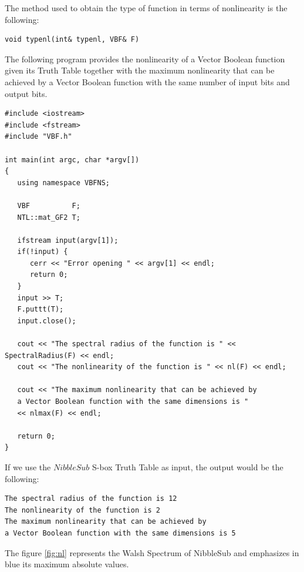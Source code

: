 The method used to obtain the type of function in terms of nonlinearity is the following:

\begin{verbatim}
void typenl(int& typenl, VBF& F)
\end{verbatim}

\begin{example}
The following program provides the nonlinearity of a Vector Boolean function given its Truth Table together with the maximum nonlinearity that can be achieved by a Vector Boolean function with the same number of input bits and output bits.

\begin{verbatim}
#include <iostream>
#include <fstream>
#include "VBF.h"

int main(int argc, char *argv[])
{
   using namespace VBFNS;

   VBF          F;
   NTL::mat_GF2 T;

   ifstream input(argv[1]);
   if(!input) {
      cerr << "Error opening " << argv[1] << endl;
      return 0;
   }
   input >> T;
   F.puttt(T);
   input.close();

   cout << "The spectral radius of the function is " << SpectralRadius(F) << endl;
   cout << "The nonlinearity of the function is " << nl(F) << endl;

   cout << "The maximum nonlinearity that can be achieved by 
   a Vector Boolean function with the same dimensions is " 
   << nlmax(F) << endl;

   return 0;
}                                                                                                                              
\end{verbatim}

If we use the $NibbleSub$ S-box Truth Table as input, the output would be the following:

\begin{verbatim}
The spectral radius of the function is 12
The nonlinearity of the function is 2
The maximum nonlinearity that can be achieved by 
a Vector Boolean function with the same dimensions is 5
\end{verbatim}

The figure \ref{fig:nl} represents the Walsh Spectrum of NibbleSub and emphasizes in blue its maximum absolute values.


\end{example}
